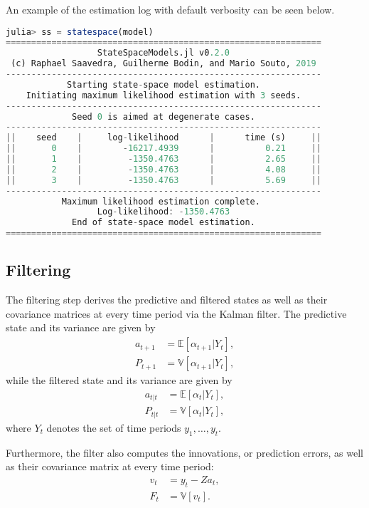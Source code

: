 \documentclass{juliacon}
\begin{document}
An example of the estimation log with default verbosity can be seen below.
%
\begin{lstlisting}[language = Julia]
julia> ss = statespace(model)
==============================================================
                  StateSpaceModels.jl v0.2.0
 (c) Raphael Saavedra, Guilherme Bodin, and Mario Souto, 2019
--------------------------------------------------------------
            Starting state-space model estimation.
    Initiating maximum likelihood estimation with 3 seeds.
--------------------------------------------------------------
             Seed 0 is aimed at degenerate cases.
--------------------------------------------------------------
||    seed    |     log-likelihood      |      time (s)     ||
||       0    |        -16217.4939      |          0.21     ||
||       1    |         -1350.4763      |          2.65     ||
||       2    |         -1350.4763      |          4.08     ||
||       3    |         -1350.4763      |          5.69     ||
--------------------------------------------------------------
           Maximum likelihood estimation complete.
                  Log-likelihood: -1350.4763
             End of state-space model estimation.
==============================================================
\end{lstlisting}

\subsection{Filtering}

The filtering step derives the predictive and filtered states as well as their covariance matrices at every time period via the Kalman filter. The predictive state and its variance are given by
%
\begin{align}
    a_{t+1} &= \mathbb{E}[\alpha_{t+1} | Y_{t}], \\
    P_{t+1} &= \mathbb{V}[\alpha_{t+1} | Y_{t}],
\end{align}
%
while the filtered state and its variance are given by
%
\begin{align}
    a_{t|t} &= \mathbb{E}[\alpha_{t} | Y_{t}], \\
    P_{t|t} &= \mathbb{V}[\alpha_{t} | Y_{t}],
\end{align}
%
where $Y_{t}$ denotes the set of time periods $y_{1}, \dots, y_{t}$.

Furthermore, the filter also computes the innovations, or prediction errors, as well as their covariance matrix at every time period:
%
\begin{align}
    v_{t} &= y_{t} - Z a_{t}, \\
    F_{t} &= \mathbb{V}[v_{t}].
\end{align}
%
\end{document}
